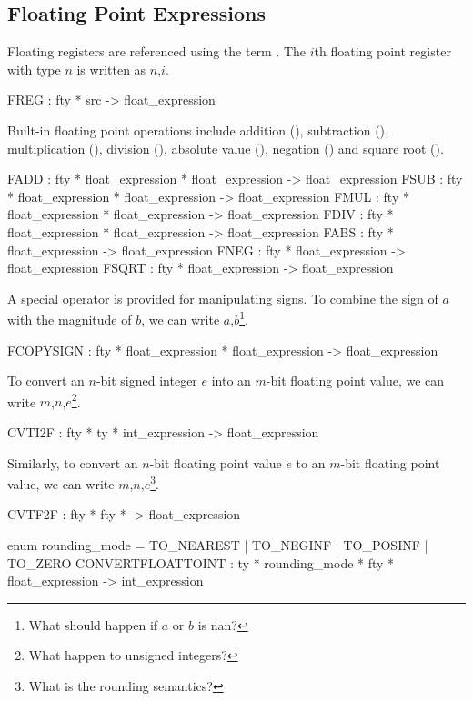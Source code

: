 \subsection{Floating Point Expressions}

 Floating registers are referenced using the term .  The
$i$th floating point register with type $n$ is written 
as $n$,$i$\sml{)}.
\begin{SML}
   FREG   : fty * src -> float_expression
\end{SML}

Built-in floating point operations include addition (), 
subtraction (), multiplication (), division 
(), absolute value (), negation ()
and square root ().
\begin{SML}
   FADD  : fty * float_expression * float_expression -> float_expression
   FSUB  : fty * float_expression * float_expression  -> float_expression
   FMUL  : fty * float_expression * float_expression -> float_expression
   FDIV  : fty * float_expression * float_expression -> float_expression
   FABS  : fty * float_expression -> float_expression
   FNEG  : fty * float_expression -> float_expression
   FSQRT : fty * float_expression -> float_expression
\end{SML}

A special operator is provided for manipulating signs.
To combine the sign of $a$ with the magnitude of $b$, we can
write $a$,$b$\sml{)}\footnote{What should 
happen if $a$ or $b$ is nan?}.
\begin{SML}
   FCOPYSIGN : fty * float_expression * float_expression -> float_expression
\end{SML}

To convert an $n$-bit signed integer $e$ into an $m$-bit floating point value,
we can write $m$,$n$,$e$\sml{)}\footnote{What happen to unsigned integers?}.
\begin{SML}
   CVTI2F : fty * ty * int_expression -> float_expression
\end{SML}

Similarly, to convert an $n$-bit floating point value $e$ to an $m$-bit
floating point value, we can write $m$,$n$,$e$\sml{)}\footnote{
What is the rounding semantics?}.
\begin{SML}
   CVTF2F : fty * fty * -> float_expression
\end{SML}

\begin{SML}
  enum rounding_mode = TO_NEAREST | TO_NEGINF | TO_POSINF | TO_ZERO
  CONVERTFLOATTOINT : ty * rounding_mode * fty * float_expression -> int_expression
\end{SML}

